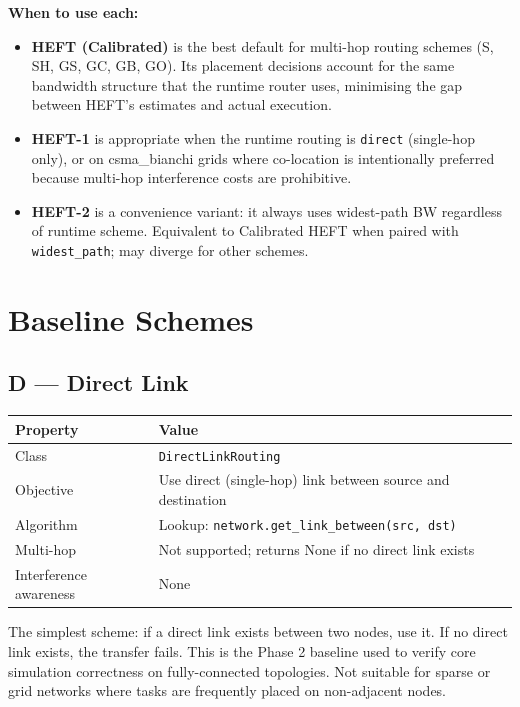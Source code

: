 \documentclass[11pt]{article}
\begin{document}
\medskip
\textbf{When to use each:}
\begin{itemize}
  \item \textbf{HEFT (Calibrated)} is the best default for multi-hop routing
        schemes (S, SH, GS, GC, GB, GO).  Its placement decisions account for
        the same bandwidth structure that the runtime router uses, minimising
        the gap between HEFT's estimates and actual execution.
  \item \textbf{HEFT-1} is appropriate when the runtime routing is
        \texttt{direct} (single-hop only), or on csma\_bianchi grids where
        co-location is intentionally preferred because multi-hop interference
        costs are prohibitive.
  \item \textbf{HEFT-2} is a convenience variant: it always uses widest-path
        BW regardless of runtime scheme.  Equivalent to Calibrated HEFT when
        paired with \texttt{widest\_path}; may diverge for other schemes.
\end{itemize}

\section{Baseline Schemes}

\subsection{D --- Direct Link}

\begin{tabular}{@{}ll@{}}
\toprule
\textbf{Property} & \textbf{Value} \\
\midrule
Class        & \texttt{DirectLinkRouting} \\
Objective    & Use direct (single-hop) link between source and destination \\
Algorithm    & Lookup: \texttt{network.get\_link\_between(src, dst)} \\
Multi-hop    & Not supported; returns None if no direct link exists \\
Interference awareness & None \\
\bottomrule
\end{tabular}

\medskip
The simplest scheme: if a direct link exists between two nodes, use it.
If no direct link exists, the transfer fails.  This is the Phase 2 baseline
used to verify core simulation correctness on fully-connected topologies.
Not suitable for sparse or grid networks where tasks are frequently placed
on non-adjacent nodes.
\end{document}
